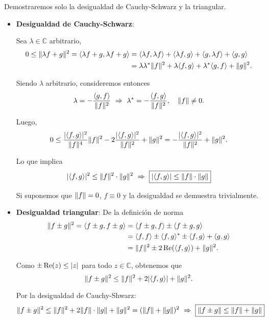 \begin{demo}
Demostraremos solo la desigualdad de Cauchy-Schwarz y la triangular.

\begin{itemize}
    \item \textbf{Desigualdad de Cauchy-Schwarz}:
    
    Sea $\lambda \in \mathbb{C}$ arbitrario,
\begin{align*}
0 \leq \lVert\lambda f + g\rVert^2 = \langle \lambda f + g , \lambda f + g\rangle &= \langle \lambda f , \lambda f \rangle + \langle \lambda f , g \rangle + \langle g, \lambda f \rangle + \langle g , g \rangle \\
&= \lambda \lambda^* \lVert f\rVert^2 + \lambda \langle f,g\rangle + \lambda^* \langle g,f\rangle + \lVert g\rVert^2.
\end{align*}

Siendo $\lambda$ arbitrario, consideremos entonces
\begin{equation*}
    \lambda = - \frac{\langle g,f \rangle}{\lVert f\rVert^2} ~\Rightarrow~ \lambda^* = - \frac{\langle f,g\rangle}{\lVert f\rVert^2}, \quad \lVert f\rVert \neq 0.
\end{equation*}

Luego, 
$$0 \leq \frac{|\langle f, g \rangle|^2}{\lVert f\rVert^4} \lVert f\rVert^2 - 2 \frac{|\langle f,g \rangle|^2}{\lVert f\rVert^2} + \lVert g\rVert^2 = -\frac{|\langle f,g \rangle|^2}{\lVert f\rVert^2} + \lVert g\rVert^2. $$

Lo que implica 
$$|\langle f,g \rangle|^2 \leq \lVert f\rVert^2 \cdot \lVert g\rVert^2 ~\Rightarrow~ \boxed{|\langle f , g \rangle| \leq \lVert f\rVert \cdot \lVert g\rVert}$$

Si suponemos que $\lVert f\rVert = 0$, $f \equiv 0$ y la desigualdad se demuestra trivialmente.

 \item \textbf{Desigualdad triangular}: De la definición de norma
 \begin{align*}
     \lVert f\pm g\rVert^2 = \langle  f \pm g , f \pm g \rangle &= \langle f \pm g , f \rangle \pm \langle f \pm g , g\rangle \\
     &= \langle f,f \rangle \pm \langle f , g \rangle^* \pm \langle f,g \rangle +  \langle g,g \rangle \\
     &= \lVert f\rVert^2 \pm 2 \operatorname{Re}(\langle f,g \rangle) + \lVert g\rVert^2.
 \end{align*}
 
 Como $\pm \operatorname{Re}(z) \leq |z|$ para todo $z \in \mathbb{C}$, obtenemos que 
 $$\lVert f\pm g\rVert^2 \leq \lVert f\rVert^2+ 2 |\langle f,g \rangle| + \lVert g\rVert^2.$$
 
 Por la desigualdad de  Cauchy-Shwarz:
 $$\lVert f\pm g\rVert^2 \leq \lVert f\rVert^2 + 2 \lVert f\rVert \cdot \lVert g\rVert + \lVert g\rVert^2 = (\lVert f\rVert + \lVert g\rVert)^2 ~\Rightarrow~ \boxed{\lVert f \pm g\rVert \leq \lVert f\rVert + \lVert g\rVert}$$
\end{itemize}


\end{demo}

